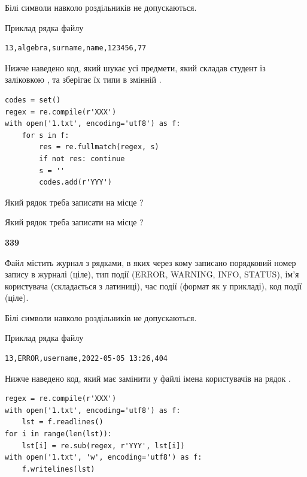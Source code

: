 Білі символи навколо роздільників не допускаються.

Приклад рядка файлу



\begin{verbatim}
13,algebra,surname,name,123456,77
\end{verbatim}


Нижче наведено код, який шукає усі предмети, який складав студент із заліковкою , та зберігає їх типи в змінній .



\begin{verbatim}
codes = set()
regex = re.compile(r'XXX')
with open('1.txt', encoding='utf8') as f:
    for s in f:
        res = re.fullmatch(regex, s)
        if not res: continue
        s = ''
        codes.add(r'YYY')
\end{verbatim}





Який рядок треба записати на місце  ?\par
\vspace{5mm}


Який рядок треба записати на місце  ?\par


\newpage

{\begin {center}\textbf{ 339}\end {center}}\par
Файл  містить журнал з рядками, в яких через кому записано поряд\-ко\-вий номер запису в журналі (ціле), тип події (ERROR, WARNING, INFO, STATUS), ім'я користувача (складається з латиниці), час події (фор\-мат як у прикладі), код події (ціле).

Білі символи навколо роздільників не допускаються.

Приклад рядка файлу



\begin{verbatim}
13,ERROR,username,2022-05-05 13:26,404
\end{verbatim}


Нижче наведено код, який має замінити у файлі імена користувачів на рядок .



\begin{verbatim}
regex = re.compile(r'XXX')
with open('1.txt', encoding='utf8') as f:
    lst = f.readlines()
for i in range(len(lst)):
    lst[i] = re.sub(regex, r'YYY', lst[i])
with open('1.txt', 'w', encoding='utf8') as f:
    f.writelines(lst)
\end{verbatim}







